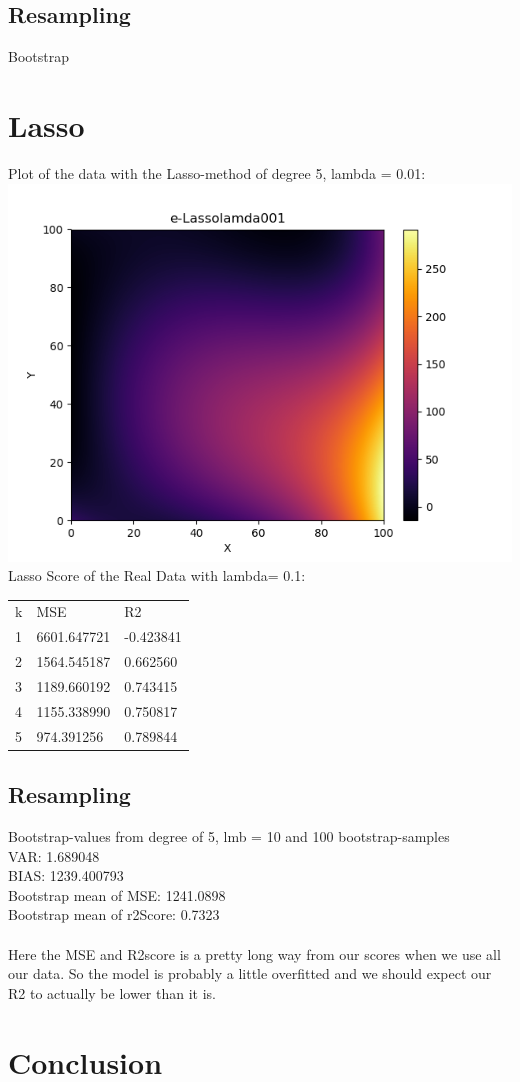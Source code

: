 \documentclass[a4paper,norsk]{article}
\begin{document}
\subsection*{Resampling}
Bootstrap
\section*{Lasso}
Plot of the data with the Lasso-method of degree 5, lambda = 0.01:
\\ \includegraphics[scale=.7]{e-Lassolamda001}
\\ Lasso Score of the Real Data with lambda= 0.1:
\begin{table}[!h]
\begin{tabular}{lll}
k & MSE                   & R2                 \\
1 & 6601.647721  & -0.423841 \\
2 & 1564.545187  & 0.662560 \\
3 & 1189.660192  & 0.743415 \\
4 & 1155.338990  & 0.750817 \\
5 & 974.391256 & 0.789844
\end{tabular}
\end{table}
\subsection*{Resampling}
Bootstrap-values from degree of 5, lmb = 10 and 100 bootstrap-samples
\\VAR: 1.689048
\\BIAS: 1239.400793
\\Bootstrap mean of MSE: 1241.0898
\\Bootstrap mean of r2Score: 0.7323
\\
\\Here the MSE and R2score is a pretty long way from our scores when we use all our data. So the model is probably a little overfitted and we should expect our R2 to actually be lower than it is.
\clearpage
\section*{Conclusion}
\end{document}
